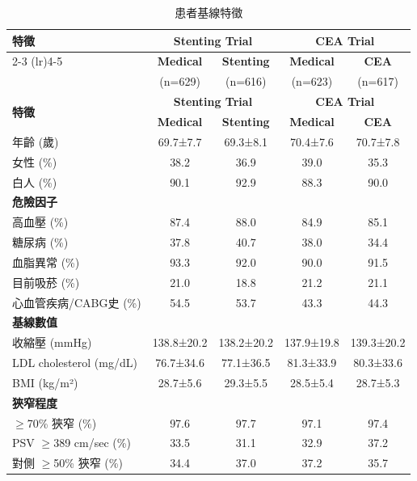 \documentclass[12pt,a4paper]{article}
\begin{document}
\begin{longtable}{p{5cm}cccc}
\caption{患者基線特徵} \\
\toprule
\multirow{2}{*}{\textbf{特徵}} & \multicolumn{2}{c}{\textbf{Stenting Trial}} & \multicolumn{2}{c}{\textbf{CEA Trial}} \\
\cmidrule(lr){2-3} \cmidrule(lr){4-5}
& \textbf{Medical} & \textbf{Stenting} & \textbf{Medical} & \textbf{CEA} \\
& (n=629) & (n=616) & (n=623) & (n=617) \\
\midrule
\endfirsthead

\toprule
\multirow{2}{*}{\textbf{特徵}} & \multicolumn{2}{c}{\textbf{Stenting Trial}} & \multicolumn{2}{c}{\textbf{CEA Trial}} \\
\cmidrule(lr){2-3} \cmidrule(lr){4-5}
& \textbf{Medical} & \textbf{Stenting} & \textbf{Medical} & \textbf{CEA} \\
\midrule
\endhead

\bottomrule
\endfoot

年齡 (歲) & 69.7±7.7 & 69.3±8.1 & 70.4±7.6 & 70.7±7.8 \\
女性 (\%) & 38.2 & 36.9 & 39.0 & 35.3 \\
白人 (\%) & 90.1 & 92.9 & 88.3 & 90.0 \\
\midrule
\multicolumn{5}{l}{\textbf{危險因子}} \\
高血壓 (\%) & 87.4 & 88.0 & 84.9 & 85.1 \\
糖尿病 (\%) & 37.8 & 40.7 & 38.0 & 34.4 \\
血脂異常 (\%) & 93.3 & 92.0 & 90.0 & 91.5 \\
目前吸菸 (\%) & 21.0 & 18.8 & 21.2 & 21.1 \\
心血管疾病/CABG史 (\%) & 54.5 & 53.7 & 43.3 & 44.3 \\
\midrule
\multicolumn{5}{l}{\textbf{基線數值}} \\
收縮壓 (mmHg) & 138.8±20.2 & 138.2±20.2 & 137.9±19.8 & 139.3±20.2 \\
LDL cholesterol (mg/dL) & 76.7±34.6 & 77.1±36.5 & 81.3±33.9 & 80.3±33.6 \\
BMI (kg/m²) & 28.7±5.6 & 29.3±5.5 & 28.5±5.4 & 28.7±5.3 \\
\midrule
\multicolumn{5}{l}{\textbf{狹窄程度}} \\
$\geq$70\% 狹窄 (\%) & 97.6 & 97.7 & 97.1 & 97.4 \\
PSV $\geq$389 cm/sec (\%) & 33.5 & 31.1 & 32.9 & 37.2 \\
對側 $\geq$50\% 狹窄 (\%) & 34.4 & 37.0 & 37.2 & 35.7 \\
\bottomrule
\end{longtable}
\end{document}
